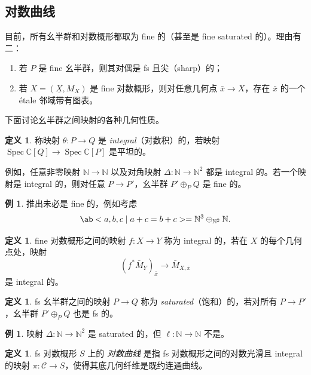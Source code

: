 \documentclass{amsart}
\theoremstyle{definition}
\newtheorem{defn}[thm]{定义}
\newtheorem{exm}[thm]{例}
\theoremstyle{remark}
\theoremstyle{plain}
\theoremstyle{definition}
\theoremstyle{remark}
\newcommand{\N}{\mathbb{N}}
\newcommand{\C}{\mathbb{C}}
\newcommand{\mc}[1]{\mathcal{#1}}
\newcommand{\ul}[1]{\underline{#1}}
\newcommand{\1}{\mathbf{1}}
\newcommand{\2}{\mathbf{2}}
\newcommand{\3}{\mathbf{3}}
\DeclareMathOperator{\Spec}{Spec}
\begin{document}
\subsection{对数曲线}%
\label{sub:Log curves}

目前，所有幺半群和对数概形都取为 fine 的（甚至是 fine saturated 的）。理由有二：
\begin{enumerate}
    \item 若 \(P\) 是 fine 幺半群，则其对偶是 fs 且尖（sharp）的；
    \item 若 \(X = (\ul{X}, M_X)\) 是 fine 对数概形，则对任意几何点 \(\bar{x} \to X\)，存在 \(\bar{x}\) 的一个 \'etale 邻域带有图表。
\end{enumerate}

下面讨论幺半群之间映射的各种几何性质。
\begin{defn}
    称映射 \(\theta \colon P \to Q\) 是 \textit{integral}（对数积）的，若映射 \(\Spec\C[Q] \to \Spec \C[P]\) 是平坦的。
\end{defn}

例如，任意非零映射 \(\N \to \N\) 以及对角映射 \(\Delta \colon\N \to \N^2\) 都是 integral 的。若一个映射是 integral 的，则对任意 \(P \to P'\)，幺半群 \(P' \oplus_P Q\) 是 fine 的。

\begin{exm}
    推出未必是 fine 的，例如考虑
    \[ \ab< a ,b,c \mid a+c=b+c> = \N^3 \oplus_{\N^2} \N. \]
\end{exm}

\begin{defn}
    fine 对数概形之间的映射 \(f \colon X \to Y\) 称为 integral 的，若在 \(X\) 的每个几何点处，映射
    \[ (f^*\bar{M}_Y)_{\bar{x}} \to \bar{M}_{X,\bar{x}} \]
    是 integral 的。
\end{defn}

\begin{defn}
    fs 幺半群之间的映射 \(P \to Q\) 称为 \textit{saturated}（饱和）的，若对所有 \(P \to P'\)，幺半群 \(P' \oplus_P Q\) 也是 fs 的。
\end{defn}

\begin{exm}
    映射 \(\Delta \colon \N \to \N^2\) 是 saturated 的，但 \(\ell \colon \N \to \N\) 不是。
\end{exm}

\begin{defn}
    fs 对数概形 \(S\) 上的 \textit{对数曲线} 是指 fs 对数概形之间的对数光滑且 integral 的映射 \(\pi \colon \mc{C} \to S\)，使得其底几何纤维是既约连通曲线。
\end{defn}
\end{document}
